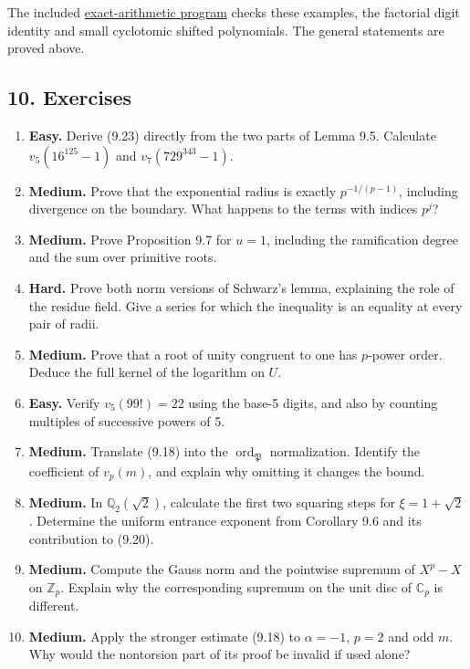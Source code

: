 \documentclass[
  11pt,
  a4paper,
]{article}
\providecommand{\tightlist}{%
  \setlength{\itemsep}{0pt}\setlength{\parskip}{0pt}}
\begin{document}
The included \href{https://kokunoyumeto.github.io/open-math-courses-public/courses/TR-BAKER/verification/padic_examples.py}{exact-arithmetic
program} checks these examples, the factorial digit identity and small
cyclotomic shifted polynomials. The general statements are proved above.

\subsection{10. Exercises}\label{exercises}

\begin{enumerate}
\def\labelenumi{\arabic{enumi}.}
\tightlist
\item
  \textbf{Easy.} Derive (9.23) directly from the two parts of Lemma 9.5.
  Calculate \(v_5(16^{125}-1)\) and \(v_7(729^{343}-1)\).
\item
  \textbf{Medium.} Prove that the exponential radius is exactly
  \(p^{-1/(p-1)}\), including divergence on the boundary. What happens
  to the terms with indices \(p^j\)?
\item
  \textbf{Medium.} Prove Proposition 9.7 for \(u=1\), including the
  ramification degree and the sum over primitive roots.
\item
  \textbf{Hard.} Prove both norm versions of Schwarz's lemma, explaining
  the role of the residue field. Give a series for which the inequality
  is an equality at every pair of radii.
\item
  \textbf{Medium.} Prove that a root of unity congruent to one has
  \(p\)-power order. Deduce the full kernel of the logarithm on \(U\).
\item
  \textbf{Easy.} Verify \(v_5(99!)=22\) using the base-5 digits, and
  also by counting multiples of successive powers of 5.
\item
  \textbf{Medium.} Translate (9.18) into the
  \(\operatorname{ord}_{\mathfrak P}\) normalization. Identify the
  coefficient of \(v_p(m)\), and explain why omitting it changes the
  bound.
\item
  \textbf{Medium.} In \(\mathbb Q_2(\sqrt2)\), calculate the first two
  squaring steps for \(\xi=1+\sqrt2\). Determine the uniform entrance
  exponent from Corollary 9.6 and its contribution to (9.20).
\item
  \textbf{Medium.} Compute the Gauss norm and the pointwise supremum of
  \(X^p-X\) on \(\mathbb Z_p\). Explain why the corresponding supremum
  on the unit disc of \(\mathbb C_p\) is different.
\item
  \textbf{Medium.} Apply the stronger estimate (9.18) to \(\alpha=-1\),
  \(p=2\) and odd \(m\). Why would the nontorsion part of its proof be
  invalid if used alone?
\end{enumerate}
\end{document}
